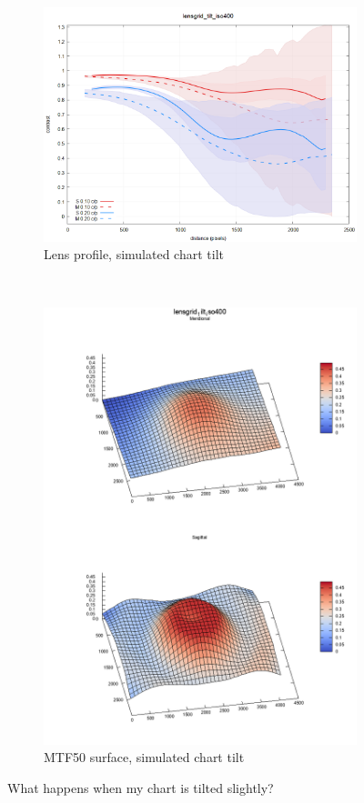 \documentclass[a4paper]{article}
\begin{document}
\begin{figure}[!ht]
\begin{subfigure}[b]{0.5\textwidth}
    \includegraphics[width=\textwidth]{figures/lg_exmple_tilt_lensgrid.png}
    \caption{Lens profile, simulated chart tilt}
\end{subfigure}
$\quad$
\begin{subfigure}[b]{0.25\textwidth}
    \includegraphics[width=\textwidth]{figures/lg_exmple_tilt_surface.png}
    \caption{MTF50 surface, simulated chart tilt}
\end{subfigure}
\caption{What happens when my chart is tilted slightly?}
\label{fig:lensgrid_tilt}
\end{figure}
\end{document}
